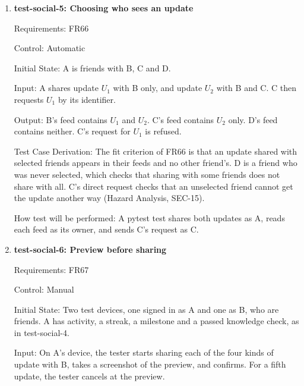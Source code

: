 \documentclass[12pt, titlepage]{article}
\begin{document}
\begin{enumerate}
Test Case Derivation: The fit criterion of FR65 is that the user can share one
update of each kind in SRS Table 6.5 and nothing else, so the test shares
each kind and tries four things outside the table. FR68 (Hazard Analysis,
SEC-35) excludes body measurements and individual activity records, which the
weight and the 4,200-step record test. The Hazard Analysis also excludes the
exact time of an activity (SEC-14), which is why no time of day may appear.
The device check covers the app, since the requests test only the backend.

How test will be performed: A pytest test sends each share request as A and
reads B's feed as B. The tester then records the options on the share screen.

\item{\textbf{test-social-5: Choosing who sees an update}\\}

Requirements: FR66

Control: Automatic

Initial State: A is friends with B, C and D.

Input: A shares update $U_1$ with B only, and update $U_2$ with B and C. C
then requests $U_1$ by its identifier.

Output: B's feed contains $U_1$ and $U_2$. C's feed contains $U_2$ only. D's
feed contains neither. C's request for $U_1$ is refused.

Test Case Derivation: The fit criterion of FR66 is that an update shared with
selected friends appears in their feeds and no other friend's. D is a friend
who was never selected, which checks that sharing with some friends does not
share with all. C's direct request checks that an unselected friend cannot
get the update another way (Hazard Analysis, SEC-15).

How test will be performed: A pytest test shares both updates as A, reads each
feed as its owner, and sends C's request as C.

\item{\textbf{test-social-6: Preview before sharing}\\}

Requirements: FR67

Control: Manual

Initial State: Two test devices, one signed in as A and one as B, who are
friends. A has activity, a streak, a milestone and a passed knowledge check,
as in test-social-4.

Input: On A's device, the tester starts sharing each of the four kinds of
update with B, takes a screenshot of the preview, and confirms. For a fifth
update, the tester cancels at the preview.


\end{enumerate}
\end{document}
